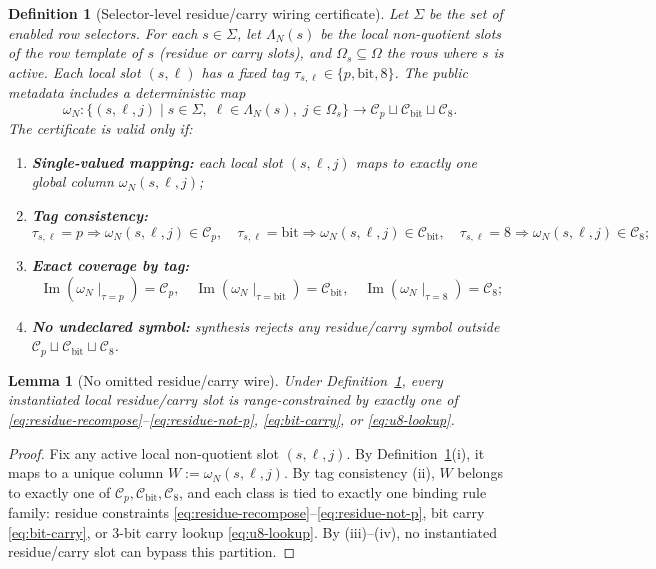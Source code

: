 ﻿\documentclass[11pt]{article}
\newtheorem{lemma}[theorem]{Lemma}
\newtheorem{definition}[theorem]{Definition}
\newcommand{\Cset}{\mathcal{C}}
\begin{document}
\begin{definition}[Selector-level residue/carry wiring certificate]
\label{def:selector-residue-carry-wiring}
Let \(\Sigma\) be the set of enabled row selectors. For each
\(s\in\Sigma\), let \(\Lambda_N(s)\) be the local non-quotient slots of the row
template of \(s\) (residue or carry slots), and \(\Omega_s\subseteq\Omega\) the
rows where \(s\) is active. Each local slot \((s,\ell)\) has a fixed tag
\(\tau_{s,\ell}\in\{p,\mathrm{bit},8\}\). The public metadata includes a
deterministic map
\[
\omega_N:
\{(s,\ell,j)\mid s\in\Sigma,\;\ell\in\Lambda_N(s),\;j\in\Omega_s\}
\to
\Cset_p\sqcup\Cset_{\mathrm{bit}}\sqcup\Cset_8.
\]
The certificate is valid only if:
\begin{enumerate}[label=(\roman*),leftmargin=2em]
    \item \textbf{Single-valued mapping:} each local slot \((s,\ell,j)\) maps to exactly
    one global column \(\omega_N(s,\ell,j)\);
    \item \textbf{Tag consistency:}
    \[
    \tau_{s,\ell}=p \Rightarrow \omega_N(s,\ell,j)\in\Cset_p,\quad
    \tau_{s,\ell}=\mathrm{bit} \Rightarrow \omega_N(s,\ell,j)\in\Cset_{\mathrm{bit}},\quad
    \tau_{s,\ell}=8 \Rightarrow \omega_N(s,\ell,j)\in\Cset_8;
    \]
    \item \textbf{Exact coverage by tag:}
    \[
    \operatorname{Im}(\omega_N\!\mid_{\tau=p})=\Cset_p,\quad
    \operatorname{Im}(\omega_N\!\mid_{\tau=\mathrm{bit}})=\Cset_{\mathrm{bit}},\quad
    \operatorname{Im}(\omega_N\!\mid_{\tau=8})=\Cset_8;
    \]
    \item \textbf{No undeclared symbol:} synthesis rejects any residue/carry
    symbol outside \(\Cset_p\sqcup\Cset_{\mathrm{bit}}\sqcup\Cset_8\).
\end{enumerate}
\end{definition}

\begin{lemma}[No omitted residue/carry wire]
\label{lem:no-omitted-residue-carry-wire}
Under Definition~\ref{def:selector-residue-carry-wiring}, every instantiated
local residue/carry slot is range-constrained by exactly one of
\eqref{eq:residue-recompose}--\eqref{eq:residue-not-p},
\eqref{eq:bit-carry}, or \eqref{eq:u8-lookup}.
\end{lemma}

\begin{proof}
Fix any active local non-quotient slot \((s,\ell,j)\). By
Definition~\ref{def:selector-residue-carry-wiring}(i), it maps to a unique
column \(W:=\omega_N(s,\ell,j)\). By tag consistency (ii), \(W\) belongs to
exactly one of \(\Cset_p,\Cset_{\mathrm{bit}},\Cset_8\), and each class is tied
to exactly one binding rule family: residue constraints
\eqref{eq:residue-recompose}--\eqref{eq:residue-not-p}, bit carry
\eqref{eq:bit-carry}, or 3-bit carry lookup \eqref{eq:u8-lookup}. By (iii)--(iv),
no instantiated residue/carry slot can bypass this partition.
\end{proof}
\end{document}
